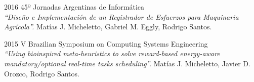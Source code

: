 \documentclass[letterpaper]{twentysecondcv} %
\begin{document}
\begin{twenty}
\twentyitem
    {2016}
    {}
    {45º Jornadas Argentinas de Informática\\}
    {\textit{``Diseño e Implementación de un Registrador de Esfuerzos para Maquinaria Agrícola''.}}
    {Matías J. Micheletto, Gabriel M. Eggly, Rodrigo Santos.}
    
\twentyitem
    {2015}
    {}
    {V Brazilian Symposium on Computing Systems Engineering\\}
    {\textit{``Using bioinspired meta-heuristics to solve reward-based energy-aware mandatory/optional real-time tasks scheduling''.}}
    {Matías J. Micheletto, Javier D. Orozco, Rodrigo Santos.}
    
\end{twenty}
\end{document}
